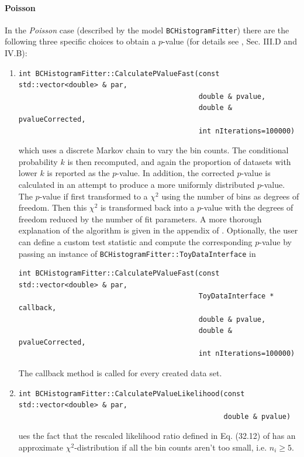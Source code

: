 \documentclass[11pt, a4paper]{article}
\begin{document}
\paragraph{Poisson}In the \textit{Poisson} case (described by the model \verb|BCHistogramFitter|)
there are the following three
specific choices to obtain a $p$-value
(for details see \cite{BAT_pValue}, Sec. III.D and IV.B):
\begin{enumerate}
\item
%
\begin{verbatim}
int BCHistogramFitter::CalculatePValueFast(const std::vector<double> & par,
                                           double & pvalue,
                                           double & pvalueCorrected,
                                           int nIterations=100000)
\end{verbatim}
%
which uses a discrete Markov chain to vary the bin counts.  The conditional
probability $k$ is then recomputed, and again the proportion of datasets with
lower $k$ is reported as the $p$-value. In addition, the corrected $p$-value is
calculated in an attempt to produce a more uniformly distributed $p$-value. The
$p$-value if first transformed to a $\chi^2$ using the number of bins as degrees
of freedom. Then this $\chi^2$ is transformed back into a $p$-value with the
degrees of freedom reduced by the number of fit parameters. A more thorough
explanation of the algorithm is given in the appendix of
\cite{BAT_pValue}. Optionally, the user can define a custom test statistic and
compute the corresponding $p$-value by passing an instance of
\verb|BCHistogramFitter::ToyDataInterface| in
\begin{verbatim}
int BCHistogramFitter::CalculatePValueFast(const std::vector<double> & par,
                                           ToyDataInterface * callback,
                                           double & pvalue,
                                           double & pvalueCorrected,
                                           int nIterations=100000)
\end{verbatim}
The callback method is called for every created data set.
\item
%
\begin{verbatim}
int BCHistogramFitter::CalculatePValueLikelihood(const std::vector<double> & par,
                                                 double & pvalue)
\end{verbatim}
%
ues the fact that the rescaled likelihood ratio defined in
Eq. (32.12) of \cite{PDGstatistics} has an approximate
$\chi^2$-distribution if all the bin counts aren't too small,
i.e. $n_i \ge 5$.


\end{enumerate}
\end{document}
